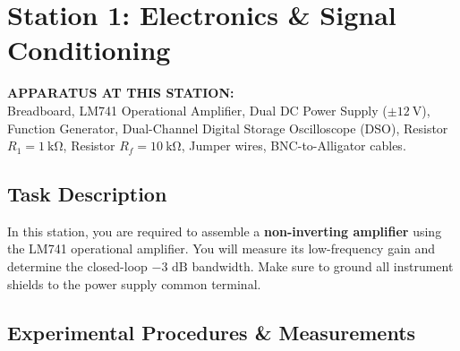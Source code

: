 \section{Station 1: Electronics \& Signal Conditioning}
\label{sec:station1}

\noindent
\begin{tcolorbox}[
    colback=primary!5,
    colframe=primary!30,
    boxrule=0.8pt,
    arc=3pt,
    left=10pt, right=10pt, top=8pt, bottom=8pt
]
\sffamily\small
\textbf{APPARATUS AT THIS STATION:} \\
Breadboard, LM741 Operational Amplifier, Dual DC Power Supply ($\pm\SI{12}{\volt}$), Function Generator, Dual-Channel Digital Storage Oscilloscope (DSO), Resistor $R_1 = \SI{1}{\kilo\ohm}$, Resistor $R_f = \SI{10}{\kilo\ohm}$, Jumper wires, BNC-to-Alligator cables.
\end{tcolorbox}

\subsection{Task Description}
In this station, you are required to assemble a \textbf{non-inverting amplifier} using the LM741 operational amplifier. You will measure its low-frequency gain and determine the closed-loop $-3\text{ dB}$ bandwidth. Make sure to ground all instrument shields to the power supply common terminal.

\subsection{Experimental Procedures \& Measurements}


